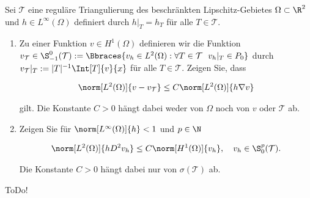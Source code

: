 
\begin{exercise}

Sei $\mathcal{T}$ eine reguläre Triangulierung des beschränkten Lipschitz-Gebietes $\Omega \subset \R^2$ und $h \in L^\infty(\Omega)$ definiert durch $h|_T = h_T$ für alle $T \in \mathcal{T}$.

\begin{enumerate}[label = \textbf{\alph*)}]
  \item Zu einer Funktion $v \in H^1(\Omega)$ definieren wir die Funktion $v_\mathcal{T} \in \S_{-1}^0(\mathcal{T}) := \Bbraces{v_h \in L^2(\Omega): \forall T \in \mathcal{T}~~ v_h|_T \in P_0}$ durch $v_\mathcal{T}|_T := |T|^{-1} \Int[T]{v}{x}$ für alle $T \in \mathcal{T}$. Zeigen Sie, dass

  \begin{align*}
    \norm[L^2(\Omega)]{v - v_\mathcal{T}}
    \leq
    C \norm[L^2(\Omega)]{h \nabla v}
  \end{align*}

  gilt. Die Konstante $C > 0$ hängt dabei weder von $\Omega$ noch von $v$ oder $\mathcal{T}$ ab.

  \item Zeigen Sie für $\norm[L^\infty(\Omega)]{h} < 1$ und $p \in \N$

  \begin{align}
    \norm[L^2(\Omega)]{h D^2v_h}
    \leq
    C \norm[H^1(\Omega)]{v_h}, \quad
    v_h \in \S_0^p(\mathcal{T}).
  \end{align}

  Die Konstante $C > 0$ hängt dabei nur von $\sigma(\mathcal{T})$ ab.
\end{enumerate}

\end{exercise}


\begin{solution}

ToDo!

\end{solution}

